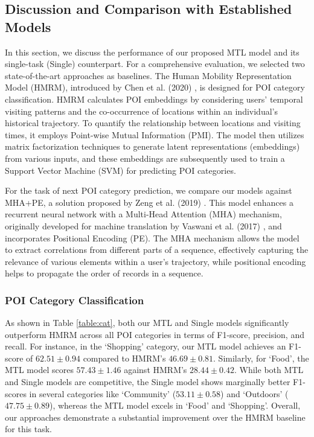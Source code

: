 \subsection{Discussion and Comparison with Established Models}
In this section, we discuss the performance of our proposed MTL model and its single-task (Single) counterpart. For a comprehensive evaluation, we selected two state-of-the-art approaches as baselines. The Human Mobility Representation Model (HMRM), introduced by Chen et al. (2020) \cite{chen2020modeling}, is designed for POI category classification. HMRM calculates POI embeddings by considering users' temporal visiting patterns and the co-occurrence of locations within an individual's historical trajectory. To quantify the relationship between locations and visiting times, it employs Point-wise Mutual Information (PMI). The model then utilizes matrix factorization techniques to generate latent representations (embeddings) from various inputs, and these embeddings are subsequently used to train a Support Vector Machine (SVM) for predicting POI categories. 

For the task of next POI category prediction, we compare our models against MHA+PE, a solution proposed by Zeng et al. (2019) \cite{zeng2019next}. This model enhances a recurrent neural network with a Multi-Head Attention (MHA) mechanism, originally developed for machine translation by Vaswani et al. (2017) \cite{vaswani2017attention}, and incorporates Positional Encoding (PE). The MHA mechanism allows the model to extract correlations from different parts of a sequence, effectively capturing the relevance of various elements within a user's trajectory, while positional encoding helps to propagate the order of records in a sequence.

\subsubsection{POI Category Classification}
As shown in Table \ref{table:cat}, both our MTL and Single models significantly outperform HMRM \cite{chen2020modeling} across all POI categories in terms of F1-score, precision, and recall. For instance, in the `Shopping' category, our MTL model achieves an F1-score of $62.51 \pm 0.94$ compared to HMRM's $46.69 \pm 0.81$. Similarly, for `Food', the MTL model scores $57.43 \pm 1.46$ against HMRM's $28.44 \pm 0.42$. While both MTL and Single models are competitive, the Single model shows marginally better F1-scores in several categories like `Community' ($53.11 \pm 0.58$) and `Outdoors' ($47.75 \pm 0.89$), whereas the MTL model excels in `Food' and `Shopping'. Overall, our approaches demonstrate a substantial improvement over the HMRM baseline for this task.




